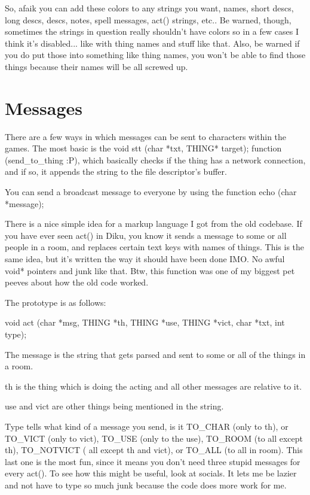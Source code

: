 So, afaik you can add these colors to any strings you want, names,
short descs, long descs, descs, notes, spell messages, act() strings,
etc.. Be warned, though, sometimes the strings in question really
shouldn't have colors so in a few cases I think it's disabled... like
with thing names and stuff like that. Also, be warned if you do put
those into something like thing names, you won't be able to find those
things because their names will be all screwed up.

\section{Messages}

There are a few ways in which messages can be sent to characters
within the games. The most basic is the void stt (char *txt, THING*
target); function (send\_to\_thing :P), which basically checks if the
thing has a network connection, and if so, it appends the string to
the file descriptor's buffer.


You can send a broadcast message to everyone by using the function echo (char *message);

There is a nice simple idea for a markup language I got from the old
codebase. If you have ever seen act() in Diku, you know it sends a
message to some or all people in a room, and replaces certain text
keys with names of things. This is the same idea, but it's written the
way it should have been done IMO. No awful void* pointers and junk
like that. Btw, this function was one of my biggest pet peeves about
how the old code worked.

The prototype is as follows:

void act (char *msg, THING *th, THING *use, THING *vict, char *txt, int type);

The message is the string that gets parsed and sent to some or all of the things in a room.

th is the thing which is doing the acting and all other messages are relative to it.

use and vict are other things being mentioned in the string. 

Type tells what kind of a message you send, is it TO\_CHAR (only to
th), or TO\_VICT (only to vict), TO\_USE (only to the use), TO\_ROOM
(to all except th), TO\_NOTVICT ( all except th and vict), or TO\_ALL
(to all in room). This last one is the most fun, since it means you
don't need three stupid messages for every act(). To see how this
might be useful, look at socials. It lets me be lazier and not have to
type so much junk because the code does more work for me.


